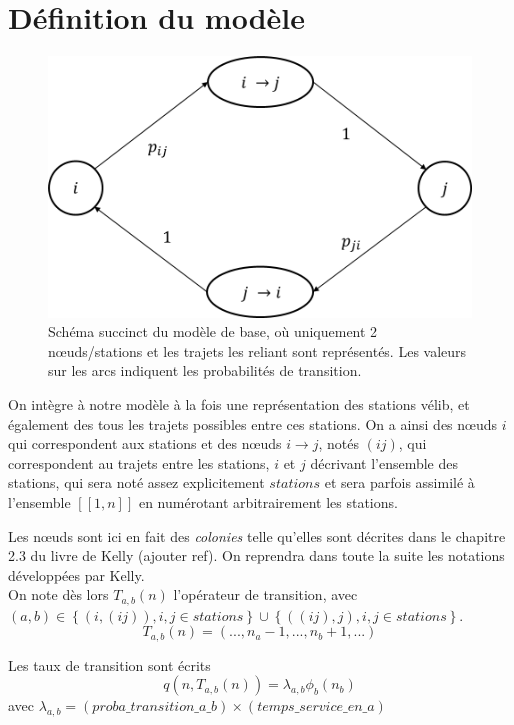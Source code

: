 \documentclass[12pt,a4paper]{article}
\begin{document}
\thispagestyle{empty}
\newpage



\section{Définition du modèle}

\begin{figure}[h]
	\centering
	\includegraphics[width=0.6\linewidth]{img/modele.png}
	\caption{Schéma succinct du modèle de base, où uniquement 2 nœuds/stations et les trajets les reliant sont représentés. Les valeurs sur les arcs indiquent les probabilités de transition.}
	\label{fig:1}
\end{figure}

On intègre à notre modèle à la fois une représentation des stations vélib, et également des tous les trajets possibles entre ces stations. On a ainsi des nœuds $i$ qui correspondent aux stations et des nœuds $i\rightarrow j$, notés $(ij)$, qui correspondent au trajets entre les stations, $i$ et $j$ décrivant l'ensemble des stations, qui sera noté assez explicitement $stations$ et sera parfois assimilé à l'ensemble $[\![1,n]\!]$ en numérotant arbitrairement les stations.

Les nœuds sont ici en fait des \textit{colonies} telle qu'elles sont décrites dans le chapitre 2.3 du livre de Kelly (ajouter ref). On reprendra dans toute la suite les notations développées par Kelly.\\


On note dès lors $T_{a,b}(n)$ l'opérateur de transition, avec $(a,b) \in \left\{ \left(i,(ij)\right), i,j \in stations \right\} \cup \left\{ \left((ij),j\right), i,j \in stations \right\}$.
\[
T_{a,b}(n) = (...,n_a - 1,..., n_b + 1, ...)
\]

Les taux de transition sont écrits
\[
q\left(n, T_{a,b} (n) \right) = \lambda_{a,b} \phi_b(n_b)
\]
avec $\lambda_{a,b} = (proba\_transition\_a\_b) \times (temps\_service\_en\_a)$\\
\end{document}
